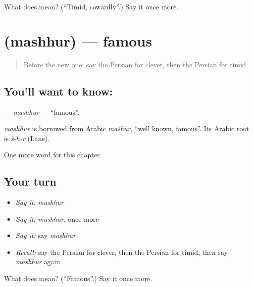 \begin{tcolorbox}[breakable,colback=teal!4,colframe=teal!35!black,title={Before you move on}]
What does  mean? (\textquotedblleft{}Timid, cowardly\textquotedblright{}.) Say it once more.
\end{tcolorbox}
\section[\texorpdfstring{\fa{مشهور} (mashhur)}{مشهور (mashhur)}]{ (mashhur) — famous}

\label{lesson:FA-C126-mashhur}



\begin{quote}
Before the new one: say the Persian for clever, then the Persian for timid.
\end{quote}

\subsection*{You'll want to know: }
\textbf{} — \emph{mashhur} — \textquotedblleft{}famous\textquotedblright{}.

\begin{cousinweb}
\emph{mashhur} is borrowed from Arabic \emph{mašhūr}, \textquotedblleft{}well known, famous\textquotedblright{}. Its Arabic root is \emph{š-h-r} (Lane).
\end{cousinweb}

\begin{grammarlens}[title={What you've built}]
One more word for this chapter.
\end{grammarlens}

\subsection*{Your turn}
\begin{itemize}
\raggedright
  \item \emph{Say it:} \emph{mashhur}
  \item \emph{Say it:} \emph{mashhur}, once more
  \item \emph{Say it:} say \emph{mashhur}
  \item \emph{Recall:} say the Persian for clever, then the Persian for timid, then say \emph{mashhur} again
\end{itemize}

\begin{tcolorbox}[breakable,colback=teal!4,colframe=teal!35!black,title={Before you move on}]
What does  mean? (\textquotedblleft{}Famous\textquotedblright{}.) Say it once more.
\end{tcolorbox}
